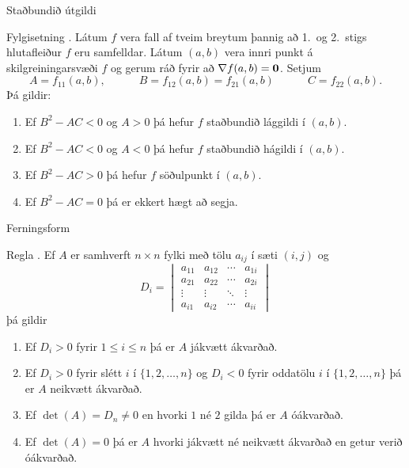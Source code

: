 \begin{frame}{Staðbundið útgildi}  

\begin {block}{Fylgisetning \kaflanr.}
Látum $f$ vera fall af tveim breytum þannig að
1.~og 2.~stigs hlutafleiður $f$ eru samfelldar.  Látum $(a,b)$ vera
innri punkt á skilgreiningarsvæði $f$ og gerum ráð fyrir að $\nabla
f(a,b)=\mbox{${\bf 0}$}$.  Setjum 
$$A=f_{11}(a,b),\qquad\quad B=f_{12}(a,b)=f_{21}(a,b)\qquad\quad
C=f_{22}(a,b).$$ 
Þá gildir:
\begin {enumerate}
 \item  Ef $B^2-AC<0$ og $A>0$  þá hefur $f$
     staðbundið lággildi í $(a,b)$.
 \item  Ef $B^2-AC<0$ og $A<0$ 
 þá hefur $f$ staðbundið
hágildi í $(a,b)$.
 \item   Ef $B^2-AC>0$ 
þá hefur $f$ söðulpunkt í
      $(a,b)$.  
 \item  Ef $B^2-AC=0$ þá er ekkert hægt að segja.  
\end {enumerate}


\end{block}
 \end {frame}
\begin{frame}{Ferningsform}  

\begin {block}{Regla \kaflanr.}
Ef $A$ er samhverft $n \times n$ fylki með tölu $a_{ij}$ í sæti $(i,j)$ og
\begin {equation*}
 D_i = \begin{vmatrix}
        a_{11} & a_{12} & \cdots & a_{1i} \\
        a_{21} & a_{22} & \cdots & a_{2i} \\
        \vdots & \vdots & \ddots & \vdots \\ 
        a_{i1} & a_{i2} & \cdots & a_{ii} 
       \end{vmatrix}
\end {equation*}
þá gildir
\begin {enumerate}
 \item Ef $D_i > 0$ fyrir $1\leq i \leq n$ þá er $A$ jákvætt ákvarðað.
 \item Ef $D_i > 0$ fyrir slétt $i$ í $\{1,2,\ldots,n\}$ og $D_i < 0$ fyrir oddatölu $i$ í $\{1,2,\ldots,n\}$ þá er $A$ neikvætt ákvarðað.
 \item Ef $\det(A) = D_n \neq 0$ en hvorki $1$ né $2$ gilda þá er $A$ óákvarðað. 
 \item Ef $\det(A) = 0$ þá er $A$ hvorki jákvætt né neikvætt ákvarðað en getur verið óákvarðað.
\end {enumerate}


\end{block}
\end{frame}
